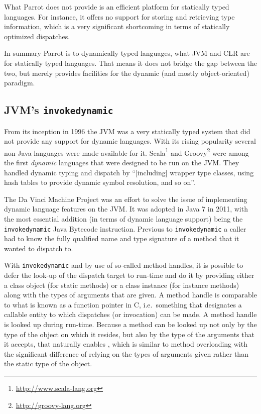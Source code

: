 What Parrot does not provide is an efficient platform for statically typed
languages. For instance, it offers no support for storing and retrieving type
information, which is a very significant shortcoming in terms of statically
optimized dispatches.

In summary Parrot is to dynamically typed languages, what JVM and CLR are for
statically typed languages. That means it does not bridge the gap between the
two, but merely provides facilities for the dynamic (and mostly object-oriented)
paradigm.

\subsection{JVM's \texttt{invokedynamic}}
\label{sec:related-work:jvm}

From its inception in 1996\cite{java-1.0-press} the JVM was a very statically
typed system that did not provide any support for dynamic languages. With its
rising popularity several non-Java languages were made available for
it. Scala\footnote{\url{http://www.scala-lang.org}} and
Groovy\footnote{\url{http://groovy-lang.org}} were among the first
\textit{dynamic} languages that were designed to be run on the JVM. They handled
dynamic typing and dispatch by ``[including] wrapper type classes, using hash
tables to provide dynamic symbol resolution, and so on''\cite{friesen14}.

The Da Vinci Machine Project\cite{da-vinci} was an effort to solve the issue of
implementing dynamic language features on the JVM. It was adopted in Java 7 in
2011, with the most essential addition (in terms of dynamic language support)
being the \texttt{invokedynamic} Java Bytecode instruction. Previous to
\texttt{invokedynamic} a caller had to know the fully qualified name and type
signature of a method that it wanted to dispatch to.

With \texttt{invokedynamic} and by use of so-called method handles, it is
possible to defer the look-up of the dispatch target to run-time and do it by
providing either a class object (for static methods) or a class instance (for
instance methods) along with the types of arguments that are given. A method
handle is comparable to what is known as a function pointer in
C\cite{friesen14}, i.e.\ something that designates a callable entity to which
dispatches (or invocation) can be made. A method handle is looked up during
run-time. Because a method can be looked up not only by the type of the object
on which it resides, but also by the type of the arguments that it accepts, that
naturally enables , which is similar to method overloading
with the significant difference of relying on the types of arguments given
rather than the static type of the object.

